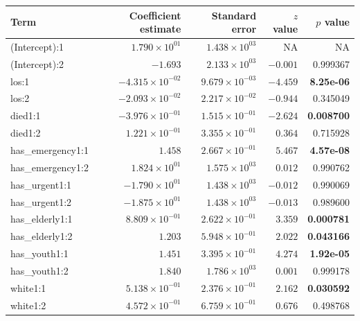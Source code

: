 \documentclass[11pt]{article}
\begin{document}
\begin{table}[h!]
\centering
\begin{tabular}{lrrrr}
\hline
\textbf{Term} & \textbf{Coefficient estimate} & \textbf{Standard error} & \textbf{$z$ value} & \textbf{$p$ value} \\
\hline
(Intercept):1                 & $1.790 \times 10^{01}$ & $1.438 \times 10^{03}$ & NA     & NA         \\
(Intercept):2                 & $-1.693$              & $2.133 \times 10^{03}$ & $-0.001$ & 0.999367   \\
los:1                         & $-4.315 \times 10^{-02}$ & $9.679 \times 10^{-03}$ & $-4.459$ & \textbf{8.25e-06} \\
los:2                         & $-2.093 \times 10^{-02}$ & $2.217 \times 10^{-02}$ & $-0.944$ & 0.345049   \\
died1:1                       & $-3.976 \times 10^{-01}$ & $1.515 \times 10^{-01}$ & $-2.624$ & \textbf{0.008700} \\
died1:2                       & $1.221 \times 10^{-01}$ & $3.355 \times 10^{-01}$ & $0.364$  & 0.715928   \\
has\_emergency1:1             & $1.458$               & $2.667 \times 10^{-01}$ & $5.467$  & \textbf{4.57e-08} \\
has\_emergency1:2             & $1.824 \times 10^{01}$ & $1.575 \times 10^{03}$ & $0.012$  & 0.990762   \\
has\_urgent1:1                & $-1.790 \times 10^{01}$ & $1.438 \times 10^{03}$ & $-0.012$ & 0.990069   \\
has\_urgent1:2                & $-1.875 \times 10^{01}$ & $1.438 \times 10^{03}$ & $-0.013$ & 0.989600   \\
has\_elderly1:1               & $8.809 \times 10^{-01}$ & $2.622 \times 10^{-01}$ & $3.359$  & \textbf{0.000781} \\
has\_elderly1:2               & $1.203$               & $5.948 \times 10^{-01}$ & $2.022$  & \textbf{0.043166} \\
has\_youth1:1                 & $1.451$               & $3.395 \times 10^{-01}$ & $4.274$  & \textbf{1.92e-05} \\
has\_youth1:2                 & $1.840$               & $1.786 \times 10^{03}$ & $0.001$  & 0.999178   \\
white1:1                      & $5.138 \times 10^{-01}$ & $2.376 \times 10^{-01}$ & $2.162$  & \textbf{0.030592} \\
white1:2                      & $4.572 \times 10^{-01}$ & $6.759 \times 10^{-01}$ & $0.676$  & 0.498768   \\

\end{tabular}
\end{table}
\end{document}
